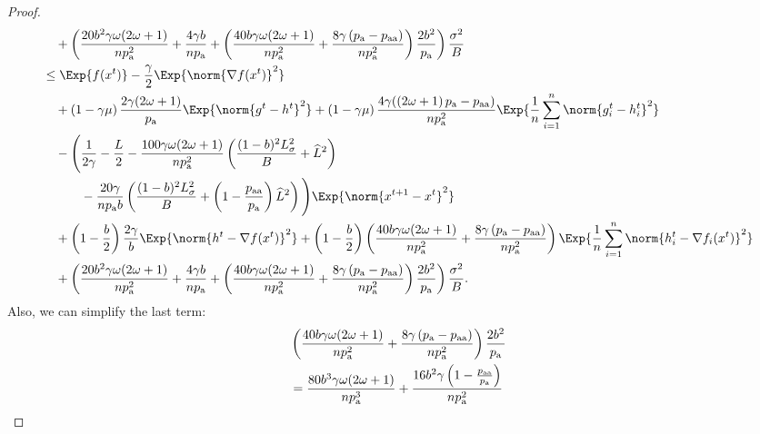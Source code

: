 \documentclass{article}
\newcommand*{\probavailable}{\ensuremath{p_{\textnormal{a}}}}
\newcommand*{\probpairaa}{\ensuremath{p_{\textnormal{aa}}}}
\begin{document}
\begin{proof}
\begin{align*}
        &\quad + \left(\frac{20 b^2 \gamma \omega (2 \omega + 1)}{n \probavailable^2} + \frac{4 \gamma b}{n \probavailable} + \left(\frac{40 b \gamma \omega (2 \omega + 1)}{n \probavailable^2} + \frac{8 \gamma \left(\probavailable - \probpairaa\right)}{n \probavailable^2}\right) \frac{2 b^2}{\probavailable}\right) \frac{\sigma^2}{B} \\
        &\leq \Exp{f(x^t)} - \frac{\gamma}{2}\Exp{\norm{\nabla f(x^t)}^2} \\
        &\quad + \left(1 - \gamma \mu\right)\frac{2\gamma (2 \omega + 1)}{\probavailable} \Exp{\norm{g^{t} - h^{t}}^2} + \left(1 - \gamma \mu\right)\frac{4\gamma (\left(2 \omega + 1\right)\probavailable - \probpairaa)}{n \probavailable^2} \Exp{\frac{1}{n}\sum_{i=1}^n\norm{g^{t}_i - h^{t}_i}^2} \\
        &\quad - \Bigg(\frac{1}{2\gamma} - \frac{L}{2} - \frac{100 \gamma \omega (2 \omega + 1)}{n \probavailable^2} \left(\frac{(1 - b)^2 L_{\sigma}^2}{B} + \widehat{L}^2\right) \\
        &\qquad\quad - \frac{20 \gamma}{n \probavailable b}\left(\frac{(1 - b)^2 L_{\sigma}^2}{B} + \left(1 - \frac{\probpairaa}{\probavailable}\right) \widehat{L}^2 \right)\Bigg) \Exp{\norm{x^{t+1} - x^t}^2} \\
        &\quad + \left(1 - \frac{b}{2}\right)\frac{2\gamma}{b} \Exp{\norm{h^{t} - \nabla f(x^{t})}^2} + \left(1 - \frac{b}{2}\right)\left(\frac{40 b \gamma \omega (2 \omega + 1)}{n \probavailable^2} + \frac{8 \gamma \left(\probavailable - \probpairaa\right)}{n \probavailable^2}\right)\Exp{\frac{1}{n}\sum_{i=1}^n\norm{h^{t}_i - \nabla f_i(x^{t})}^2} \\
        &\quad + \left(\frac{20 b^2 \gamma \omega (2 \omega + 1)}{n \probavailable^2} + \frac{4 \gamma b}{n \probavailable} + \left(\frac{40 b \gamma \omega (2 \omega + 1)}{n \probavailable^2} + \frac{8 \gamma \left(\probavailable - \probpairaa\right)}{n \probavailable^2}\right) \frac{2 b^2}{\probavailable}\right) \frac{\sigma^2}{B}.
      \end{align*}
      Also, we can simplify the last term:
      \begin{align*}
        &\left(\frac{40 b \gamma \omega (2 \omega + 1)}{n \probavailable^2} + \frac{8 \gamma \left(\probavailable - \probpairaa\right)}{n \probavailable^2}\right) \frac{2 b^2}{\probavailable} \\
        &= \frac{80 b^3 \gamma \omega (2 \omega + 1)}{n \probavailable^3} + \frac{16 b^2 \gamma \left(1 - \frac{\probpairaa}{\probavailable}\right)}{n \probavailable^2} \\

\end{align*}
\end{proof}
\end{document}
